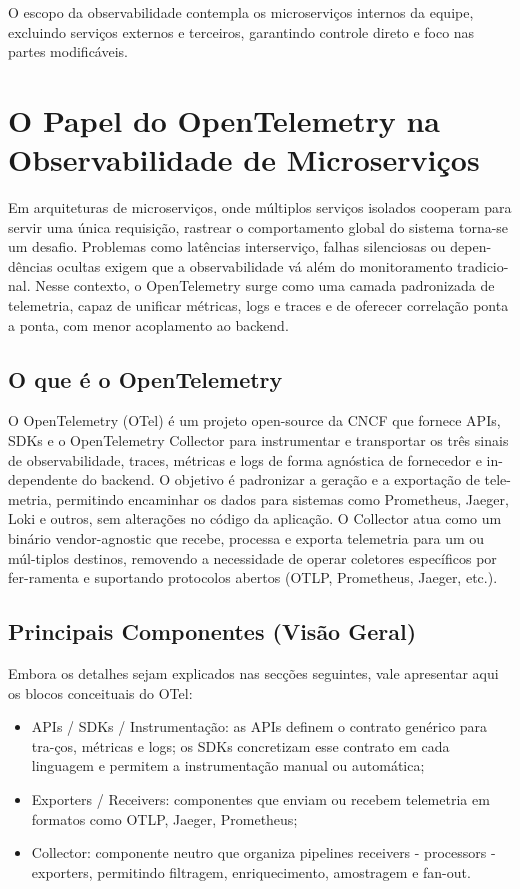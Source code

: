 O escopo da observabilidade contempla os microserviços internos da equipe, excluindo serviços externos e terceiros, garantindo controle direto e foco nas partes modificáveis.

\section{O Papel do OpenTelemetry na Observabilidade de Microserviços}

Em arquiteturas de microserviços, onde múltiplos serviços isolados cooperam para servir uma única requisição, rastrear o comportamento global do sistema torna-se um desafio. Problemas como latências interserviço, falhas silenciosas ou depen-dências ocultas exigem que a observabilidade vá além do monitoramento tradicio-nal. Nesse contexto, o OpenTelemetry surge como uma camada padronizada de telemetria, capaz de unificar métricas, logs e traces e de oferecer correlação ponta a ponta, com menor acoplamento ao backend.

\subsection{O que é o OpenTelemetry}

O OpenTelemetry (OTel) é um projeto open-source da CNCF que fornece APIs, SDKs e o OpenTelemetry Collector para instrumentar e transportar os três sinais de observabilidade, traces, métricas e logs de forma agnóstica de fornecedor e in-dependente do backend. O objetivo é padronizar a geração e a exportação de tele-metria, permitindo encaminhar os dados para sistemas como Prometheus, Jaeger, Loki e outros, sem alterações no código da aplicação. O Collector atua como um binário vendor-agnostic que recebe, processa e exporta telemetria para um ou múl-tiplos destinos, removendo a necessidade de operar coletores específicos por fer-ramenta e suportando protocolos abertos (OTLP, Prometheus, Jaeger, etc.).

\subsection{Principais Componentes (Visão Geral)}

Embora os detalhes sejam explicados nas secções seguintes, vale apresentar aqui os blocos conceituais do OTel:

\begin{itemize}
    \item APIs / SDKs / Instrumentação: as APIs definem o contrato genérico para tra-ços, métricas e logs; os SDKs concretizam esse contrato em cada linguagem e permitem a instrumentação manual ou automática;
    \item Exporters / Receivers: componentes que enviam ou recebem telemetria em formatos como OTLP, Jaeger, Prometheus;
    \item Collector: componente neutro que organiza pipelines receivers - processors - exporters, permitindo filtragem, enriquecimento, amostragem e fan-out.
\end{itemize}

